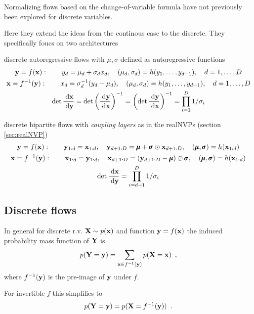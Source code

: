 Normalizing flows based on the change-of-variable formula have not previously been explored for discrete variables.

Here they extend the ideas from the continous case to the discrete.
They specifically foucs on two architectures
\begin{compactitem}
\item discrete autoregressive flows with $\mu, \sigma$ defined as autoregressive functions 
\begin{gather}
\mathbf{y} = f(\mathbf{x}): \qquad y_d = \mu_d + \sigma_d x_d, \quad (\mu_d, \sigma_d) = h(y_1, \ldots, y_{d-1}), \quad d = 1, \ldots, D \nonumber \\
\mathbf{x} = f^{-1}(\mathbf{y}): \qquad x_d = \sigma^{-1}_d (y_d - \mu_d), \quad (\mu_d, \sigma_d) = h(y_1, \ldots, y_{d-1}), \quad d = 1, \ldots, D \nonumber \\
\det \frac{\; \text{d} \mathbf{x}}{\; \text{d} \mathbf{y}} = \det \left(\frac{\; \text{d} \mathbf{y}}{\; \text{d} \mathbf{x}}\right)^{-1} = \left(\det \frac{\; \text{d} \mathbf{y}}{\; \text{d} \mathbf{x}}\right)^{-1} = \prod_{i=1}^D 1 / \sigma_i
\end{gather}
\item discrete bipartite flows with \emph{coupling layers} as in the realNVPs (section \ref{sec:realNVP})
\begin{gather}
\mathbf{y} = f(\mathbf{x}): \qquad \mathbf{y}_{1:d} = \mathbf{x}_{1:d}, \quad \mathbf{y}_{d+1:D} = \pmb{\mu} + \pmb{\sigma} \odot \mathbf{x}_{d+1:D}, \quad (\pmb{\mu}, \pmb{\sigma}) = h(\mathbf{x}_{1:d}) \nonumber \\
\mathbf{x} = f^{-1}(\mathbf{y}): \qquad \mathbf{x}_{1:d} = \mathbf{y}_{1:d}, \quad \mathbf{x}_{d+1:D} = (\mathbf{y}_{d+1:D} - \pmb{\mu}) \oslash \pmb{\sigma} , \quad (\pmb{\mu}, \pmb{\sigma}) = h(\mathbf{x}_{1:d}) \nonumber \\
\det \frac{\; \text{d} \mathbf{x}}{\; \text{d} \mathbf{y}} = \prod_{i=d+1}^D 1 / \sigma_i
\end{gather}
\end{compactitem}

\subsection{Discrete flows}

In general for discrete r.v. $\mathbf{X} \sim p(\mathbf{x})$ and function $\mathbf{y} = f(\mathbf{x})$ the induced probability mass function of $\mathbf{Y}$ is
\begin{equation}
p(\mathbf{Y} = \mathbf{y}) = \sum_{\mathbf{x} \in f^{-1}(\mathbf{y})} p(\mathbf{X} = \mathbf{x}) \enspace ,
\end{equation}
where $f^{-1}(\mathbf{y})$ is the pre-image of $\mathbf{y}$ under $f$.

For invertible $f$ this simplifies to
\begin{equation}
p(\mathbf{Y} = \mathbf{y}) = p(\mathbf{X} = f^{-1}(\mathbf{y})) \enspace .
\end{equation}

